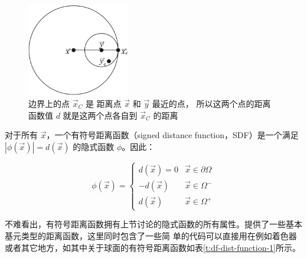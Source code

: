 \begin{figure}
	\sidecaption
	\includegraphics[width=0.4\textwidth]{figures/df/distance-function}
	\caption{边界上的点 $\vec{x}_C$ 是 距离点 $\vec{x}$ 和 $\vec{y}$ 最近的点， 所以这两个点的距离函数值 $d$ 就是这两个点各自到 $\vec{x}_C$ 的距离}
	\label{f:df-distance-function}
\end{figure}

对于所有 $\vec{x}$，一个有符号距离函数（signed distance function，SDF）是一个满足 $|\phi(\vec{x})| = d(\vec{x})$ 的隐式函数 $\phi$。因此：

\begin{equation}
	\phi(\vec{x})=\begin{cases}
		d(\vec{x})=0 & \vec{x}\in\partial\Omega \\
		-d(\vec{x}) & \vec{x}\in \Omega^{-} \\
		d(\vec{x}) & \vec{x}\in \Omega^{+}
	\end{cases}
\end{equation}

不难看出，有符号距离函数拥有上节讨论的隐式函数的所有属性。\cite{w:distance-function}提供了一些基本基元类型的距离函数，这里同时包含了一些简 单的代码可以直接用在例如着色器或者其它地方，如其中关于球面的有符号距离函数如表\ref{t:df-dist-function-1}所示。

